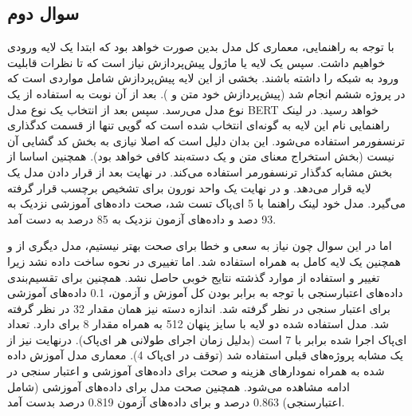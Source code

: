 \documentclass{article}
\begin{document}
\subsection{سوال دوم}

با توجه به راهنمایی، معماری کل مدل بدین صورت خواهد بود که ابتدا یک لایه ورودی خواهیم داشت. سپس یک لایه یا ماژول پیش‌پردازش نیاز است که تا نظرات قابلیت ورود به شبکه را داشته باشند. بخشی از این لایه پیش‌پردازش شامل مواردی است که در پروژه ششم انجام شد (پیش‌پردازش خود متن و ). بعد از آن نوبت به استفاده از یک نوع مدل  می‌رسد. سپس بعد از انتخاب یک نوع مدل BERT خواهد رسید. در لینک راهنمایی نام این لایه به گونه‌ای انتخاب شده است که گویی تنها از قسمت کدگذاری ترنسفورمر استفاده می‌شود. این بدان دلیل است که اصلا نیازی به بخش کد گشایی آن نیست (بخش استخراج معنای متن و یک دسته‌بند کافی خواهد بود). همچنین اساسا  از بخش مشابه کدگذار ترنسفورمر استفاده می‌کند. در نهایت بعد از قرار دادن مدل  یک لایه  قرار می‌دهد. و در نهایت یک واحد نورون برای تشخیص برچسب قرار گرفته می‌گیرد. مدل خود لینک راهنما با 5 ای‌پاک تست شد، صحت داده‌های آموزشی نزدیک به 93 دصد و داده‌های آزمون نزدیک به 85 درصد به دست آمد.

 اما در این سوال چون نیاز به سعی و خطا برای صحت بهتر نیستیم، مدل دیگری از  و همچنین یک لایه کامل  به همراه  استفاده شد. اما تغییری در نحوه ساخت  داده نشد زیرا تغییر و استفاده از موارد گذشته نتایج خوبی حاصل نشد. همچنین برای تقسیم‌بندی داده‌های اعتبارسنجی با توجه به برابر بودن کل آموزش و آزمون، 0.1 داده‌های آموزشی برای اعتبار سنجی در نظر گرفته شد. اندازه دسته نیز همان مقدار 32 در نظر گرفته شد. مدل  استفاده شده دو لایه با سایز پنهان 512 به همراه مقدار 8 برای  دارد. تعداد ای‌پاک اجرا شده برابر با 7 است (بدلیل زمان اجرای طولانی هر ای‌پاک). درنهایت نیز از یک  مشابه پروژه‌های قبلی استفاده شد (توقف در ای‌پاک 4). معماری مدل آموزش داده شده به همراه نمودارهای هزینه و صحت برای داده‌های آموزشی و اعتبار سنجی در ادامه مشاهده می‌شود. همچنین صحت مدل برای داده‌های آموزشی (شامل اعتبارسنجی) 0.863 درصد و برای داده‌های آزمون  0.819 درصد بدست آمد.
\end{document}
